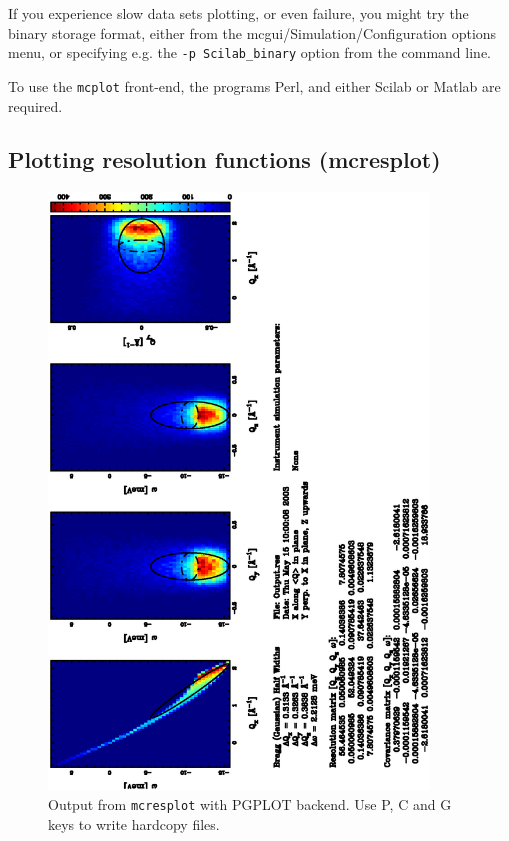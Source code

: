 If you experience slow data sets plotting, or even failure, you might try the
binary storage format, either from the mcgui/Simulation/Configuration options
menu, or specifying e.g. the \verb+-p Scilab_binary+ option from the command
line.

To use the \verb+mcplot+ front-end, the programs Perl, and either Scilab or
Matlab are required.  


\subsection{Plotting resolution functions (mcresplot)}
\label{s:mcresplot}

\begin{figure}[htb!]
  \begin{center}
    \includegraphics[angle=-90,width=0.9\textwidth]{figures/mcresplot_PGPLOT.ps}
  \end{center}
\caption{Output from \texttt{mcresplot} with PGPLOT backend.
  Use P, C and G keys to write hardcopy files.}
\label{fig:mcresplot_PGPLOT}
\end{figure}

